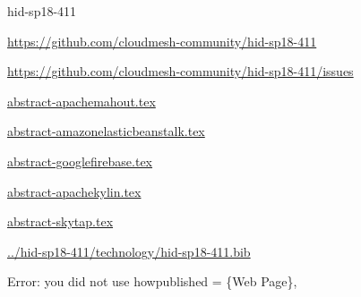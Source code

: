 \begin{IU}

hid-sp18-411

\url{https://github.com/cloudmesh-community/hid-sp18-411}

\url{https://github.com/cloudmesh-community/hid-sp18-411/issues}

\href{https://github.com/cloudmesh-community/hid-sp18-411/blob/master//technology/abstract-apachemahout.tex}{abstract-apachemahout.tex}

\href{https://github.com/cloudmesh-community/hid-sp18-411/blob/master//technology/abstract-amazonelasticbeanstalk.tex}{abstract-amazonelasticbeanstalk.tex}

\href{https://github.com/cloudmesh-community/hid-sp18-411/blob/master//technology/abstract-googlefirebase.tex}{abstract-googlefirebase.tex}

\href{https://github.com/cloudmesh-community/hid-sp18-411/blob/master//technology/abstract-apachekylin.tex}{abstract-apachekylin.tex}

\href{https://github.com/cloudmesh-community/hid-sp18-411/blob/master//technology/abstract-skytap.tex}{abstract-skytap.tex}

\href{https://github.com/cloudmesh-community/hid-sp18-411/blob/master//technology/hid-sp18-411.bib}{../hid-sp18-411/technology/hid-sp18-411.bib}

Error: you did not use howpublished = \{Web Page\},

\end{IU}


